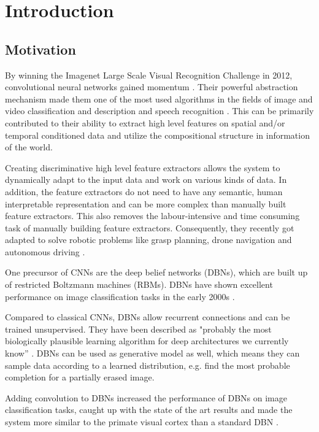 \chapter{Introduction}

\section{Motivation} \label{c:motiv}

By winning the Imagenet Large Scale Visual Recognition Challenge in 2012, convolutional neural networks gained momentum \cite{NIPS2012_4824}. 
Their powerful abstraction mechanism made them one of the most used algorithms in the fields of image and video classification and description and speech recognition \cite{szegedy2015going}\cite{karpathy2014large}\cite{abdel2014convolutional}\cite{LeCun2015}. 
This can be primarily contributed to their ability to extract high level features on spatial and/or temporal conditioned data and utilize the compositional structure in information of the world.

Creating discriminative high level feature extractors allows the system to dynamically adapt to the input data and work on various kinds of data. 
In addition, the feature extractors do not need to have any semantic, human interpretable representation and can be more complex than manually built feature extractors. 
This also removes the labour-intensive and time consuming task of manually building feature extractors.
Consequently, they recently got adapted to solve robotic problems like grasp planning, drone navigation and autonomous driving \cite{giusti2016machine}\cite{levine2016learning}\cite{chen2015deepdriving}. 

One precursor of CNNs are the deep belief networks (DBNs), which are built up of restricted Boltzmann machines (RBMs). 
DBNs have shown excellent performance on image classification tasks in the early 2000s \cite{hinton2006fast}\cite{lee2009convolutional}.

Compared to classical CNNs, DBNs allow recurrent connections and can be trained unsupervised. 
They have been described as  "probably the most biologically plausible learning algorithm for deep architectures we currently know” \cite{bengio2015towards}. 
DBNs can be used as generative model as well, which means they can sample data according to a learned distribution, e.g. find the most probable completion for a partially erased image.

Adding convolution to DBNs increased the performance of DBNs on image classification tasks, caught up with the state of the art results and made the system more similar to the primate visual cortex than a standard DBN \cite{lee2009convolutional}. 

